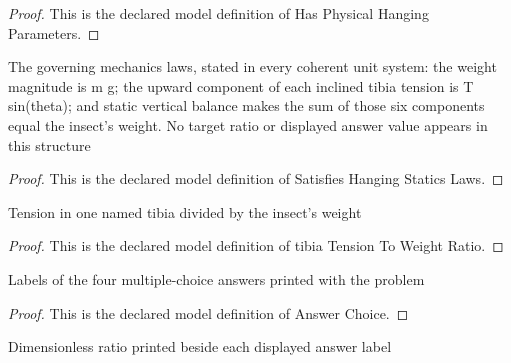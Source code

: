 \begin{proof}
  This is the declared model definition of Has Physical Hanging Parameters.
\end{proof}
\begin{definition}
  \label{def:physics:phyx-mini-0758:phyxminiproblems-problemphyxmini0758-satisfieshangingstaticslaws}
  The governing mechanics laws, stated in every coherent unit system: the weight magnitude is m g; the upward component of each inclined tibia tension is T sin(theta); and static vertical balance makes the sum of those six components equal the insect's weight. No target ratio or displayed answer value appears in this structure
\end{definition}
\begin{proof}
  This is the declared model definition of Satisfies Hanging Statics Laws.
\end{proof}
\begin{definition}
  \label{def:physics:phyx-mini-0758:phyxminiproblems-problemphyxmini0758-tibiatensiontoweightratio}
  Tension in one named tibia divided by the insect's weight
\end{definition}
\begin{proof}
  This is the declared model definition of tibia Tension To Weight Ratio.
\end{proof}
\begin{definition}
  \label{def:physics:phyx-mini-0758:phyxminiproblems-problemphyxmini0758-answerchoice}
  Labels of the four multiple-choice answers printed with the problem
\end{definition}
\begin{proof}
  This is the declared model definition of Answer Choice.
\end{proof}
\begin{definition}
  \label{def:physics:phyx-mini-0758:phyxminiproblems-problemphyxmini0758-displayedratio}
  Dimensionless ratio printed beside each displayed answer label
\end{definition}
